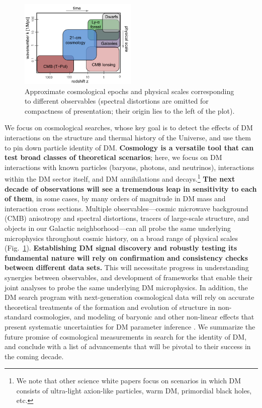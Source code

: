 \documentclass[12pt]{article}
\begin{document}
\begin{figure}
\begin{center}
\vspace{-0.9cm}
\includegraphics[width=0.5\textwidth]{scales.png}
\end{center}
\vspace{-0.8cm}
\caption{Approximate cosmological epochs and physical scales corresponding to different observables (spectral distortions are omitted for compactness of presentation; their origin lies to the left of the plot).}
\vspace{-0.2cm}
\label{fig:scales}
\end{figure}
We focus on cosmological searches, whose key goal is to detect the effects of DM interactions on the structure and thermal history of the Universe, and use them to pin down particle identity of DM.
\textbf{Cosmology is a versatile tool that can test broad classes of theoretical scenarios}; here, we focus on DM interactions with known particles (baryons, photons, and neutrinos), interactions within the DM sector itself, and DM annihilations and decays.\footnote{We note that other science white papers focus on scenarios in which DM consists of ultra-light axion-like particles, warm DM, primordial black holes, etc.}
\textbf{The next decade of observations will see a tremendous leap in sensitivity to each of them}, in some cases, by many orders of magnitude in DM mass and interaction cross sections.
Multiple observables---cosmic microwave background (CMB) anisotropy and spectral distortions, tracers of large-scale structure, and objects in our Galactic neighborhood---can all probe the same underlying microphysics throughout cosmic history, on a broad range of physical scales (Fig.~\ref{fig:scales}).
\textbf{Establishing DM signal discovery and robustly testing its fundamental nature will rely on confirmation and consistency checks between different data sets.}
This will necessitate progress in understanding synergies between observables, and development of frameworks that enable their joint analyses to probe the same underlying DM microphysics.
In addition, the DM search program with next-generation cosmological data will rely on accurate theoretical treatments of the formation and evolution of structure in non-standard cosmologies, and modeling of baryonic and other non-linear effects that present systematic uncertainties for DM parameter inference \cite{2019arXiv190201055D,2018PhRvD..98h3540M,AliHaimoud_19}.
We summarize the future promise of cosmological measurements in search for the identity of DM, and conclude with a list of advancements that will be pivotal to their success in the coming decade.
\vspace{-0.4cm}
\end{document}
